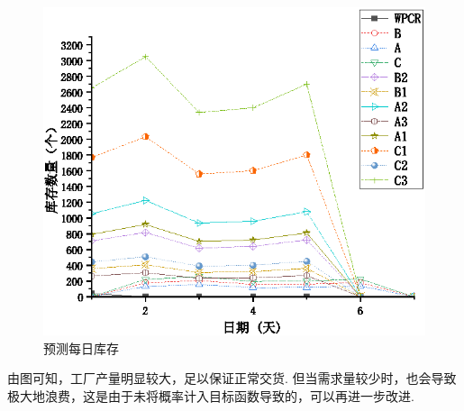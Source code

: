 \begin{figure}[!htbp]
	\centering
	\includegraphics{Image/问题四库存.eps}
	\caption{预测每日库存}\label{预测每日库存}
\end{figure}

由图可知，工厂产量明显较大，足以保证正常交货.
但当需求量较少时，也会导致极大地浪费，这是由于未将概率计入目标函数导致的，可以再进一步改进.

